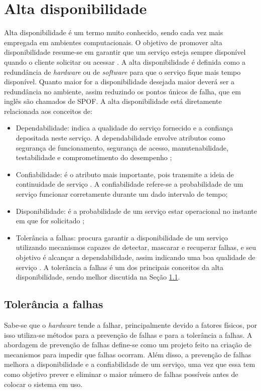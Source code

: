 \chapter{Alta disponibilidade}
\label{cap:altadisponibilidade}

Alta disponibilidade é um termo muito conhecido, sendo cada vez mais empregada em ambientes computacionais. O objetivo de promover 
alta disponibilidade resume-se em garantir que um serviço esteja sempre disponível quando o cliente solicitar ou acessar \cite{costa2009}.
A alta disponibilidade é definida como a redundância de \textit{hardware} ou de \textit{software} para que o serviço fique mais tempo disponível.
Quanto maior for a disponibilidade desejada maior deverá ser a redundância no ambiente, assim reduzindo os pontos únicos de falha,
que em inglês são chamados de \ac{SPOF}. A alta disponibilidade está diretamente relacionada aos conceitos de: 
\begin{itemize}
 \item Dependabilidade: indica a qualidade do serviço fornecido e a confiança depositada neste serviço. A dependabilidade envolve atributos 
 como segurança de funcionamento, segurança de acesso, manutenabilidade, testabilidade e comprometimento do desempenho \cite{weber2002};
 \item Confiabilidade: é o atributo mais importante, pois transmite a ideia de continuidade de serviço \cite{pankaj1994}. A confiabilidade 
 refere-se a probabilidade de um serviço funcionar corretamente durante um dado intervalo de tempo;
 \item Disponibilidade: é a probabilidade de um serviço estar operacional no instante em que for solicitado \cite{costa2009};
 \item Tolerância a falhas: procura garantir a disponibilidade de um serviço utilizando mecanismos capazes de detectar, mascarar e recuperar 
 falhas, e seu objetivo é alcançar a dependabilidade, assim indicando uma boa qualidade de serviço \cite{costa2009}. A tolerância a falhas é 
 um dos principais conceitos da alta disponibilidade, sendo melhor discutida na Seção \ref{section:toleranciafalhas}.
\end{itemize}

\section{Tolerância a falhas}
\label{section:toleranciafalhas}

Sabe-se que o \textit{hardware} tende a falhar, principalmente devido a fatores físicos, por isso utiliza-se métodos para a prevenção 
de falhas e para a tolerância a falhas. A abordagem de prevenção de falhas define-se como um projeto feito na criação de mecanismos para
impedir que falhas ocorram. Além disso, a prevenção de falhas melhora a disponibilidade e a confiabilidade de um serviço, uma vez que essa 
tem como objetivo prever e eliminar o maior número de falhas possíveis antes de colocar o sistema em uso. 

